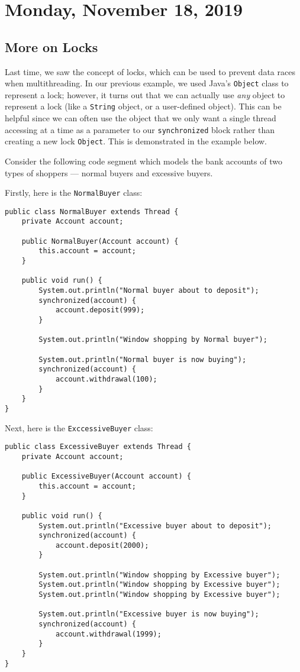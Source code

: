 \section{Monday, November 18, 2019}
\subsection{More on Locks}

Last time, we saw the concept of locks, which can be used to prevent data races when multithreading. In our previous example, we used Java's \verb!Object! class to represent a lock; however, it turns out that we can actually use \textit{any} object to represent a lock (like a \verb!String! object, or a user-defined object). This can be helpful since we can often use the object that we only want a single thread accessing at a time as a parameter to our \verb!synchronized! block rather than creating a new lock \verb!Object!. This is demonstrated in the example below.


Consider the following code segment which models the bank accounts of two types of shoppers --- normal buyers and excessive buyers.


Firstly, here is the \verb!NormalBuyer! class: 


\begin{lstlisting}
public class NormalBuyer extends Thread {
	private Account account;
	
	public NormalBuyer(Account account) {
		this.account = account;
	}

	public void run() {
		System.out.println("Normal buyer about to deposit");
		synchronized(account) {
			account.deposit(999);
		}
		
		System.out.println("Window shopping by Normal buyer");
		
		System.out.println("Normal buyer is now buying");
		synchronized(account) {
			account.withdrawal(100);
		}		
	}
}
\end{lstlisting}

Next, here is the \verb!ExccessiveBuyer! class:

\begin{lstlisting}
public class ExcessiveBuyer extends Thread {
	private Account account;
	
	public ExcessiveBuyer(Account account) {
		this.account = account;
	}

	public void run() {
		System.out.println("Excessive buyer about to deposit");
		synchronized(account) {
			account.deposit(2000);
		}
		
		System.out.println("Window shopping by Excessive buyer");
		System.out.println("Window shopping by Excessive buyer");
		System.out.println("Window shopping by Excessive buyer");
		
		System.out.println("Excessive buyer is now buying");
		synchronized(account) {
			account.withdrawal(1999);
		}
	}
}
\end{lstlisting}

